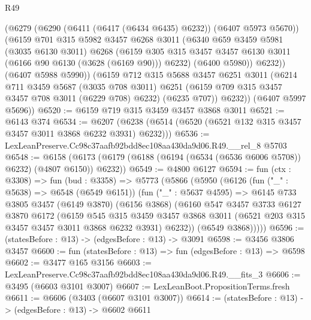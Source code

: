 \begin{lexlean}{R49}
\begin{coremodule}
          (@6279
            (@6290 (@6411 (@6417 (@6434 @6435) @6232)) (@6407 @5973 @5670))
            (@6159
              @701
              @315
              @5982
              @3457
              @6268
              @3011
              (@6340
                @659
                @3459
                @5981
                (@3035 @6130 @3011)
                @6268
                (@6159
                  @305
                  @315
                  @3457
                  @3457
                  @6130
                  @3011
                  (@6166 @90 @6130 (@3628 (@6169 @90)))
                  @6232)
                (@6400 @5980))
              @6232))
          (@6407 @5988 @5990))
        (@6159
          @712
          @315
          @5688
          @3457
          @6251
          @3011
          (@6214
            @711
            @3459
            @5687
            (@3035 @708 @3011)
            @6251
            (@6159 @709 @315 @3457 @3457 @708 @3011 (@6229 @708) @6232)
            (@6235 @707))
          @6232))
      (@6407 @5997 @5696))
@6520 := @6159 @719 @315 @3459 @3457 @3868 @3011
@6521 := @6143 @374
@6534 := @6207 (@6238 (@6514 (@6520 (@6521 @132 @315 @3457 @3457 @3011 @3868 @6232 @3931) @6232)))
@6536 := LexLeanPreserve.Cc98c37aafb92bdd8ec108aa430da9d06.R49.__rel_8 @5703
@6548 := @6158 (@6173 (@6179 (@6188 (@6194 (@6534 (@6536 @6006 @5708)) @6232) (@4807 @6150)) @6232))
@6549 := @4800 @6127
@6594 := fun (ctx : @3308) =>
  fun (bud : @3358) =>
  @5773
    (@5866
      (@5950
        (@6126
          (fun ("_" : @5638) => @6548 (@6549 @6151))
          (fun ("_" : @5637 @4595) =>
          @6145
            @733
            @3805
            @3457
            (@6149 @3870)
            (@6156 @3868)
            (@6160
              @547
              @3457
              @3733
              @6127
              @3870
              @6172
              (@6159
                @545
                @315
                @3459
                @3457
                @3868
                @3011
                (@6521 @203 @315 @3457 @3457 @3011 @3868 @6232 @3931)
                @6232))
            (@6549 @3868)))))
@6596 := (statesBefore : @13) -> (edgesBefore : @13) -> @3091
@6598 := @3456 @3806 @3457
@6600 := fun (statesBefore : @13) => fun (edgesBefore : @13) => @6598
@6602 := @3477 @165 @3156
@6603 := LexLeanPreserve.Cc98c37aafb92bdd8ec108aa430da9d06.R49.__fits_3
@6606 := @3495 (@6603 @3101 @3007)
@6607 := LexLeanBoot.PropositionTerms.fresh
@6611 := @6606 (@3403 (@6607 @3101 @3007))
@6614 := (statesBefore : @13) -> (edgesBefore : @13) -> @6602 @6611

\end{coremodule}
\end{lexlean}
